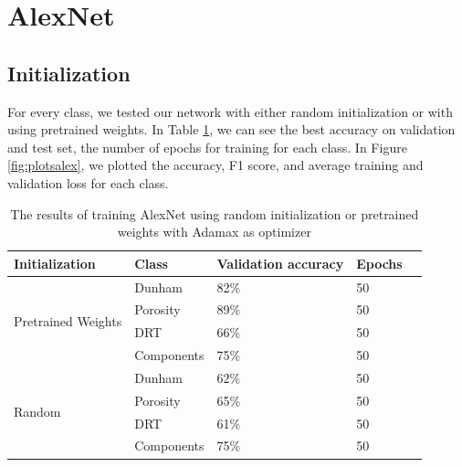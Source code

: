 
\section{AlexNet}\label{sec:aleX}
\subsection{Initialization}
For every class, we tested our network with either random initialization or with using pretrained weights. In Table \ref{tab:alexinit}, we can see the best accuracy on validation and test set, the number of epochs for training for each class.  
In Figure \ref{fig:plotsalex}, we plotted the accuracy, F1 score, and average training and validation loss for each class. 
\begin{table}
\caption{\label{tab:alexinit} The results of training AlexNet using random initialization or pretrained weights with Adamax as optimizer}
\centering
\begin{tabular}[b]{| l | l | l | l | l |}
\hline
    Initialization & Class & Validation accuracy  & Epochs\\ \hline
    \multirow{4}{*}{Pretrained Weights} & Dunham &  82\%  & 50 \\ %
    & Porosity & 89\% &  50 \\
    &DRT & 66\% &  50 \\
    &Components & 75\% &  50 \\ \hline
     \multirow{4}{*}{Random} & Dunham &  62\% & 50 \\
    & Porosity & 65\% &  50 \\
    &DRT & 61\% &  50 \\
    &Components & 75\% & 50 \\ \hline
\end{tabular} 
\end{table}

